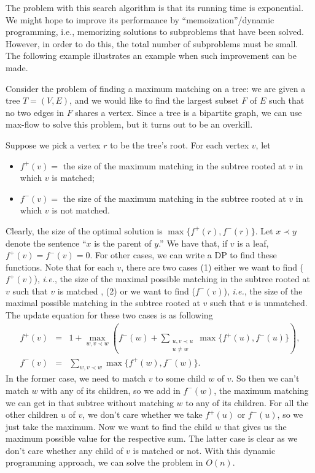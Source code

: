 \documentclass{article}
\begin{document}
The problem with this search algorithm is that its running time is exponential. We might hope to improve
its performance by ``memoization''/dynamic programming, i.e., memorizing solutions to subproblems that have been 
solved. However, in order to do this, the total number of subproblems must be small. The following example
illustrates an example when such improvement can be made.

Consider the problem of finding a maximum matching on a tree: we are given a tree $T = (V,E)$, and we would like to
find the largest subset $F$ of $E$ such that no two edges in $F$ shares a vertex. Since a tree is a bipartite graph,
we can use max-flow to solve this problem, but it turns out to be an overkill.

Suppose we pick a vertex $r$ to be the tree's root. For each vertex $v$, let
\begin{itemize}
\item $f^{+}(v) = $ the size of the maximum matching in the subtree rooted at $v$ in which $v$ is matched;
\item $f^{-}(v) = $ the size of the maximum matching in the subtree rooted at $v$ in which $v$ is not matched.
\end{itemize}
Clearly, the size of the optimal solution is $\max\{ f^{+}(r), f^{-}(r) \}.$ Let $x \prec y$ denote the sentence
``$x$ is the parent of $y$.'' We have that, if $v$ is a leaf, $f^+(v) = f^-(v) = 0.$ For other cases, we can write a DP to find these functions. Note that for each $v$, there are two cases (1) either we want to find ($f^+(v)$), \emph{i.e.}, the size of the maximal possible matching in the subtree rooted at $v$ such that $v$ is matched , (2) or we want to find ($f^-(v)$), \emph{i.e.}, the size of the maximal possible matching in the subtree rooted at $v$ such that $v$ is unmatched.  The update equation for these two cases is as following
\begin{eqnarray*}
f^{+}(v) & = & 1 + \max_{w, v \prec w} 
\left( f^-(w) + \sum_{\substack{u, v \prec u\\ u \neq w}} \max\{ f^{+}(u), f^{-}(u) \} \right),\\
f^{-}(v) & = & \sum_{w,v \prec w} \max\{ f^+(w), f^-(w) \}.
\end{eqnarray*}
In the former case, we need to match $v$ to some child $w$ of $v$. So then we can't match $w$ with any of its children, so we add in $f^-(w)$, the maximum matching we can get in that subtree without matching $w$ to any of its children. For all the other children $u$ of $v$, we don't care whether we take $f^+(u)$ or $f^-(u)$, so we just take the maximum. Now we want to find the child $w$ that gives us the maximum possible value for the respective sum. The latter case is clear as we don't care whether any child of $v$ is matched or not. With this dynamic programming approach, we can solve the problem in $O(n)$.
\end{document}
